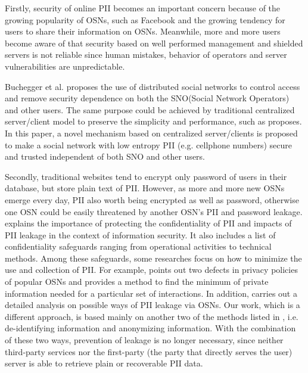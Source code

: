 \documentclass[10pt, conference, compsocconf]{IEEEtran}
\begin{document}
    Firstly, security of online PII becomes an important concern \cite{lzf1, lzf2} because
    of the growing popularity of OSNs, such as Facebook and
    the growing tendency for users to share their information
    on OSNs.
    Meanwhile, more and more users
    become aware of that security based on well performed
    management and shielded
    servers is not reliable since human mistakes, behavior of operators and server
    vulnerabilities are unpredictable.

    Buchegger et al.\cite{lzf3, lzf4} proposes the use of distributed social networks
    to control access and
    remove security dependence on both the SNO(Social Network Operators) and other users.
    The same purpose could be achieved by traditional centralized server/client model
    to preserve the simplicity and performance, such as \cite{lzf5} proposes.
    In this paper, a novel mechanism based on centralized
    server/clients is proposed to make a social network with low entropy PII
    (e.g. cellphone numbers) secure and trusted independent of both SNO and other users.

    Secondly, traditional websites tend to encrypt only password of users in their database,
    but store plain text of PII. However, as more and more new OSNs emerge every day,
    PII also worth being encrypted as well as password, otherwise
    one OSN could be easily threatened by another OSN's PII and password leakage. \cite{guide}
    explains the importance of protecting the confidentiality of PII
    and impacts of PII leakage in the
    context of information security. It also includes a list of confidentiality
    safeguards ranging from operational activities to technical methods. Among
    these safeguards, some researches focus on how to minimize the use and
    collection of PII. For example, \cite{charact} points out two defects
    in privacy policies of popular OSNs and provides a method to find the minimum
    of private information needed for a particular set of interactions. In addition,
    \cite{leakage} carries out a detailed analysis on possible ways of PII
    leakage via OSNs. Our work, which is a different approach, is based mainly
    on another two of the methods listed in \cite{guide}, i.e. de-identifying
    information and anonymizing information. With the combination of these two ways,
    prevention of leakage is no longer necessary, since neither third-party services
    nor the first-party (the party that directly serves the user) server is able to
    retrieve plain or recoverable PII data.
\end{document}
